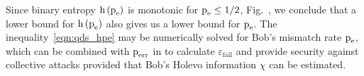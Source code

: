 Since binary entropy $\text{h}\left(\text{p}_{\text{e}}\right)$ is monotonic for $\text{p}_{\text{e}} \le 1/2$, Fig.~, we conclude that a lower bound for $\text{h}\left(\text{p}_{\text{e}}\right)$ also gives us a lower bound for $\text{p}_{\text{e}}$.  The inequality~\ref{eqn:qds_hpe} may be numerically solved for Bob's mismatch rate $\text{p}_{\text{e}}$, which can be combined with $\text{p}_{\text{err}}$ in to calculate $\varepsilon_{\text{fail}}$ and provide security against collective attacks  provided that Bob's Holevo information $\chi$ can be estimated.





















































